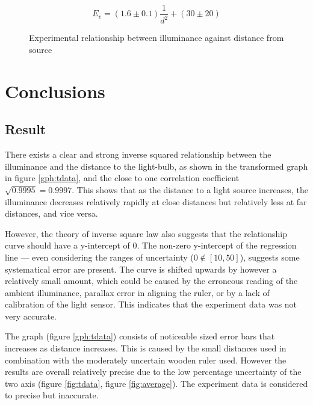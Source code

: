 \documentclass[a4paper,12pt]{article}
\begin{document}
\begin{figure}[h!]
    \[
       E_v = (1.6 \pm 0.1) \frac{1}{d^2} + (30 \pm 20)
    \]
    \caption{Experimental relationship between illuminance against distance from source}
    \label{fig:rel}
\end{figure}


\section{Conclusions}
\subsection{Result}

There exists a clear and strong inverse squared relationship between the illuminance and the distance to the light-bulb, as shown in the transformed graph in figure \ref{gph:tdata}, and the close to one correlation coefficient $\sqrt{0.9995}=0.9997$. This shows that as the distance to a light source increases, the illuminance decreases relatively rapidly at close distances but relatively less at far distances, and vice versa.

However, the theory of inverse square law also suggests that the relationship curve should have a y-intercept of 0. The non-zero y-intercept of the regression line --- even considering the ranges of uncertainty ($0 \notin [10, 50]$), suggests some systematical error are present. The curve is shifted upwards by however a relatively small amount, which could be caused by the erroneous reading of the ambient illuminance, parallax error in aligning the ruler, or by a lack of calibration of the light sensor. This indicates that the experiment data was not very accurate.

The graph (figure \ref{gph:tdata}) consists of noticeable sized error bars that increases as distance increases. This is caused by the small distances used in combination with the moderately uncertain wooden ruler used. However the results are overall relatively precise due to the low percentage uncertainty of the two axis (figure \ref{fig:tdata}, figure \ref{fig:average}). The experiment data is considered to precise but inaccurate.
\end{document}
